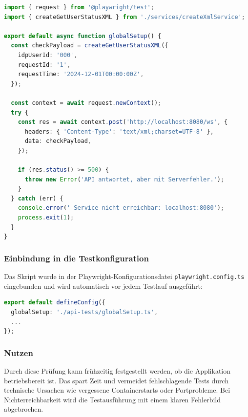 \begin{lstlisting}[language=TypeScript, caption={globalSetup.ts – Prüfung der Erreichbarkeit der API}]
import { request } from '@playwright/test';
import { createGetUserStatusXML } from './services/createXmlService';

export default async function globalSetup() {
  const checkPayload = createGetUserStatusXML({
    idpUserId: '000',
    requestId: '1',
    requestTime: '2024-12-01T00:00:00Z',
  });

  const context = await request.newContext();
  try {
    const res = await context.post('http://localhost:8080/ws', {
      headers: { 'Content-Type': 'text/xml;charset=UTF-8' },
      data: checkPayload,
    });

    if (res.status() >= 500) {
      throw new Error('API antwortet, aber mit Serverfehler.');
    }
  } catch (err) {
    console.error(' Service nicht erreichbar: localhost:8080');
    process.exit(1);
  }
}
\end{lstlisting}

\subsubsection*{Einbindung in die Testkonfiguration}

Das Skript wurde in der Playwright-Konfigurationsdatei \texttt{playwright.config.ts} eingebunden und wird automatisch vor jedem Testlauf ausgeführt:

\begin{lstlisting}[language=TypeScript, caption={Ausschnitt aus \texttt{playwright.config.ts}}]
export default defineConfig({
  globalSetup: './api-tests/globalSetup.ts',
  ...
});
\end{lstlisting}

\subsubsection*{Nutzen}

Durch diese Prüfung kann frühzeitig festgestellt werden, ob die Applikation betriebsbereit ist. Das spart Zeit und vermeidet fehlschlagende Tests durch technische Ursachen wie vergessene Containerstarts oder Portprobleme. Bei Nichterreichbarkeit wird die Testausführung mit einem klaren Fehlerbild abgebrochen.

